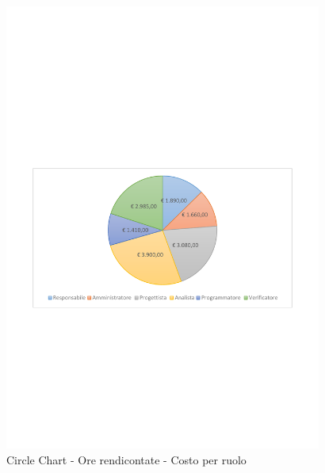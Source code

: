 \documentclass[../PianoProgetto.tex]{subfiles}
\begin{document}
	\begin{figure}[!h]
		\centering
		\includegraphics[width=0.93\textwidth , trim=2cm 9.5cm 2cm 11cm]{grafici/Riepilogo/Rendicontate/costo}
			\caption{Circle Chart - Ore rendicontate - Costo per ruolo}
		\label{fig:CircleChart-rendicontate_costo}
	\end{figure}
\vfill	
\end{document}
